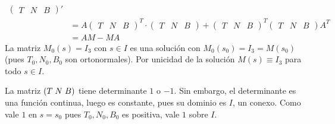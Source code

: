 \documentclass{article}
\begin{document}
\begin{dem}
\begin{align*}
        \begin{pmatrix}
            T & N & B
        \end{pmatrix}' \\
        &= A
        \begin{pmatrix}
            T & N & B
        \end{pmatrix}^{T}\cdot
        \begin{pmatrix}
            T & N & B
        \end{pmatrix}+
        \begin{pmatrix}
            T & N & B
        \end{pmatrix}^{T}
        \begin{pmatrix}
            T & N & B
        \end{pmatrix}A^{T} \\
        &= AM-MA
    \end{align*}
    La matriz $M_{0}(s)=I_{3}$ con $s\in I$ es una solución con $M_{0}(s_{0})=I_{3}=M(s_{0})$ 
    (pues $T_{0},N_{0},B_{0}$ son ortonormales). Por unicidad de la solución $M(s)\equiv I_{3}$
    para todo $s\in I$.
    \vspace{4mm}

    \noindent La matriz $(T\hspace{1mm}N\hspace{1mm}B)$ tiene determinante $1$ o $-1$. Sin embargo,
    el determinante es una función continua, luego es constante, pues su dominio es $I$, un conexo.
    Como vale $1$ en $s=s_{0}$ pues $T_{0},N_{0},B_{0}$ es positiva, vale $1$ sobre $I$.
    \vspace{4mm}


\end{dem}
\end{document}
